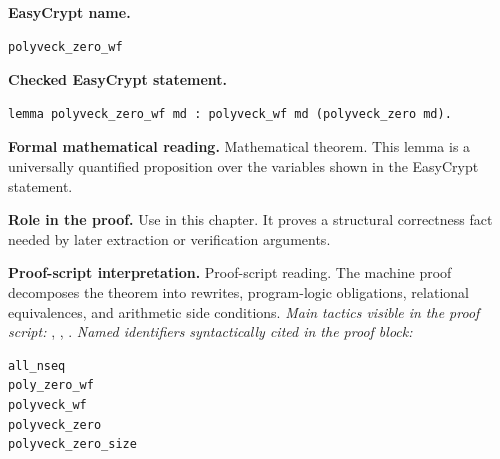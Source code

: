 \begin{formaltheorem}
\noindent\textbf{EasyCrypt name.}
\begin{lstlisting}[language=EasyCrypt,basicstyle=\ttfamily\scriptsize]
polyveck_zero_wf
\end{lstlisting}
\noindent\textbf{Checked EasyCrypt statement.}
\begin{lstlisting}[language=EasyCrypt,basicstyle=\ttfamily\scriptsize]
lemma polyveck_zero_wf md : polyveck_wf md (polyveck_zero md).
\end{lstlisting}
\noindent\textbf{Formal mathematical reading.}
Mathematical theorem. This lemma is a universally quantified proposition over the variables shown in the EasyCrypt statement.

\noindent\textbf{Role in the proof.}
Use in this chapter. It proves a structural correctness fact needed by later extraction or verification arguments.

\noindent\textbf{Proof-script interpretation.}
Proof-script reading. The machine proof decomposes the theorem into rewrites, program-logic obligations, relational equivalences, and arithmetic side conditions.
\emph{Main tactics visible in the proof script:} , , .
\emph{Named identifiers syntactically cited in the proof block:}
\begin{lstlisting}[language=EasyCrypt,basicstyle=\ttfamily\scriptsize]
all_nseq
poly_zero_wf
polyveck_wf
polyveck_zero
polyveck_zero_size
\end{lstlisting}

\end{formaltheorem}

